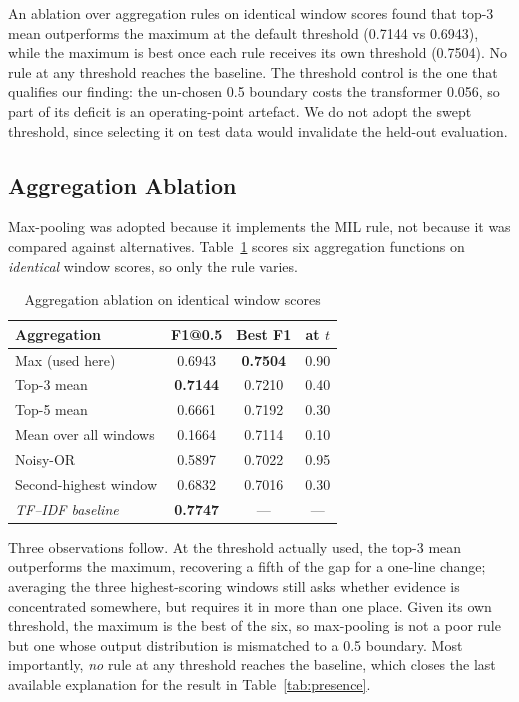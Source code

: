 \documentclass[journal,a4paper]{IEEEtran}
\begin{document}
An ablation over aggregation rules on identical window scores found that top-3 mean outperforms
the maximum at the default threshold (0.7144 vs 0.6943), while the maximum is best once each
rule receives its own threshold (0.7504). No rule at any threshold reaches the baseline. The
threshold control is the one that qualifies our finding: the un-chosen 0.5 boundary costs the
transformer 0.056, so part of its deficit is an operating-point artefact. We do not adopt the
swept threshold, since selecting it on test data would invalidate the held-out evaluation.

\subsection{Aggregation Ablation}
Max-pooling was adopted because it implements the MIL rule, not because it was compared against
alternatives. Table~\ref{tab:pool} scores six aggregation functions on \emph{identical} window
scores, so only the rule varies.

\begin{table}[!t]
\caption{Aggregation ablation on identical window scores}
\label{tab:pool}
\centering
\small
\setlength{\tabcolsep}{4pt}
\begin{tabular}{lccc}
\toprule
\textbf{Aggregation} & \textbf{F1@0.5} & \textbf{Best F1} & \textbf{at $t$}\\
\midrule
Max (used here)        & 0.6943 & \textbf{0.7504} & 0.90\\
Top-3 mean             & \textbf{0.7144} & 0.7210 & 0.40\\
Top-5 mean             & 0.6661 & 0.7192 & 0.30\\
Mean over all windows  & 0.1664 & 0.7114 & 0.10\\
Noisy-OR               & 0.5897 & 0.7022 & 0.95\\
Second-highest window  & 0.6832 & 0.7016 & 0.30\\
\midrule
\emph{TF--IDF baseline} & \textbf{0.7747} & --- & ---\\
\bottomrule
\end{tabular}
\end{table}

Three observations follow. At the threshold actually used, the top-3 mean outperforms the
maximum, recovering a fifth of the gap for a one-line change; averaging the three
highest-scoring windows still asks whether evidence is concentrated somewhere, but requires it
in more than one place. Given its own threshold, the maximum is the best of the six, so
max-pooling is not a poor rule but one whose output distribution is mismatched to a 0.5
boundary. Most importantly, \emph{no} rule at any threshold reaches the baseline, which closes
the last available explanation for the result in Table~\ref{tab:presence}.
\end{document}
